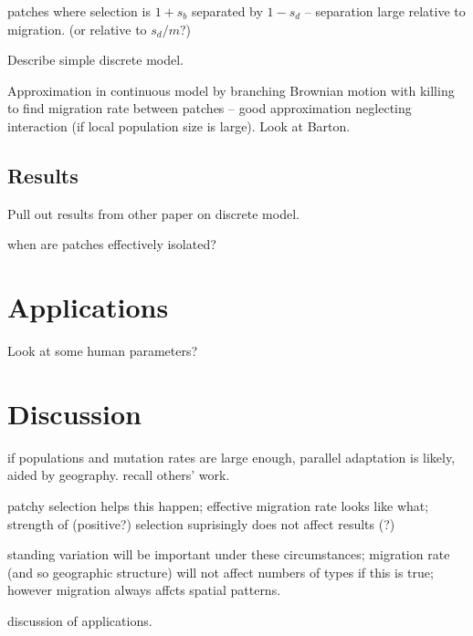 \documentclass{article}
\begin{document}
patches where selection is $1+s_b$ separated by $1-s_d$ -- separation large relative to migration.  
(or relative to $s_d/m$?)

Describe simple discrete model.

Approximation in continuous model by branching Brownian motion with killing to find migration rate between patches --
good approximation neglecting interaction (if local population size is large).
Look at Barton.

\subsection{Results}

Pull out results from other paper on discrete model.

when are patches effectively isolated?

\section{Applications}

Look at some human parameters?

\section{Discussion}

if populations and mutation rates are large enough, parallel adaptation is likely, aided by geography.
recall others' work.

patchy selection helps this happen;
effective migration rate looks like what;
strength of (positive?) selection suprisingly does not affect results (?)

standing variation will be important under these circumstances;
migration rate (and so geographic structure) will not affect numbers of types if this is true;
however migration always affcts spatial patterns.

discussion of applications.
\end{document}
